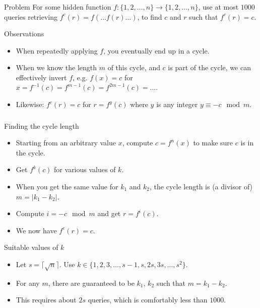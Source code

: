 \begin{frame}
    \frametitle{\problemtitle}
    \begin{block}{Problem}
        For some hidden function $f: \{1,2,\ldots,n\} \rightarrow \{1,2,\ldots,n\}$, use at most $1000$ queries retrieving $f^c(r) = f( \ldots f(r) \ldots )$, to find $c$ and $r$ such that $f^c(r) = c$.
    \end{block}
	\pause
	\begin{block}{Observations}
		\begin{itemize}
			\item When repeatedly applying $f$, you eventually end up in a cycle.
			\item When we know the length $m$ of this cycle, and $c$ is part of the cycle, we can effectively invert $f$, e.g. $f(x) = c$ for $x = f^{-1}(c) = f^{m-1}(c) = f^{2m-1}(c) = \ldots$.
			\item Likewise: $f^c(r) = c$ for $r = f^{y}(c)$ where $y$ is any integer $y \equiv -c \mod m$.
		\end{itemize}
	\end{block}
\end{frame}
\begin{frame}
    \frametitle{\problemtitle}
	\begin{block}{Finding the cycle length}
		\begin{itemize}
			\item Starting from an arbitrary value $x$, compute $c = f^n(x)$ to make sure $c$ is in the cycle.
			\item Get $f^k(c)$ for various values of $k$.
			\item When you get the same value for $k_1$ and $k_2$, the cycle length is (a divisor of) $m = |k_1 - k_2|$.
			\item Compute $i = -c \mod m$ and get $r = f^i(c)$.
			\item We now have $f^c(r) = c$.
		\end{itemize}
	\end{block}
	\pause
	\begin{block}{Suitable values of $k$}
		\begin{itemize}
			\item Let $s = \lceil \sqrt{n} \rceil$. Use $k \in \{1, 2, 3, \ldots, s-1, s, 2s, 3s, \ldots, s^2\}$.
			\item For any $m$, there are guaranteed to be $k_1$, $k_2$ such that $m = k_1 - k_2$.
			\item This requires about $2s$ queries, which is comfortably less than $1000$.
		\end{itemize}
	\end{block}
\end{frame}
